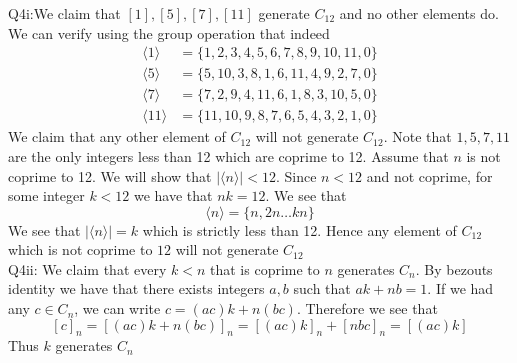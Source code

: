 \documentclass[letterpaper]{article}
\newcommand{\lan}{\langle}
\newcommand{\ran}{\rangle}
\newcommand{\inn}[1]{\lan#1\ran}
\begin{document}
\noindent
Q4i:We claim that $[1],[5],[7],[11]$ generate $C_{12}$ and no other elements do. We can verify using the group operation that indeed 
\begin{align*}
    \inn{1} & = \{1,2,3,4,5,6,7,8,9,10,11,0\}
    \\ \inn{5} & = \{5,10,3,8,1,6,11,4,9,2,7,0\}
    \\ \inn{7} & = \{7,2,9,4,11,6,1,8,3,10,5,0\}
    \\ \inn{11} & = \{11,10,9,8,7,6,5,4,3,2,1,0 \}
\end{align*}
We claim that any other element of $C_{12}$ will not generate $C_{12}$. Note that $1,5,7,11$ are the only integers less than 12 which are coprime to 12. Assume that $n$ is not coprime to 12. We will show that $|\inn{n}| < 12$. Since $n<12$ and not coprime, for some integer $k<12$ we have that $nk = 12$. We see that 
$$\inn{n} = \{n ,2n \dots kn \} $$
We see that $|\inn{n}| = k$ which is strictly less than 12. Hence any element of $C_{12}$ which is not coprime to $12$ will not generate $C_{12}$
\newline \\ 
Q4ii: We claim that every $k<n$ that is coprime to $n$ generates $C_{n}$. By bezouts identity we have that there exists integers $a,b$ such that $ak + nb =1$. If we had any $c\in C_{n}$, we can write $c = (ac)k + n(bc)$. Therefore we see that $$[c]_n = [(ac)k + n(bc)]_n =  [(ac)k]_n + [nbc]_n = [(ac)k]$$
Thus $k$ generates $C_n$ 
\end{document}
